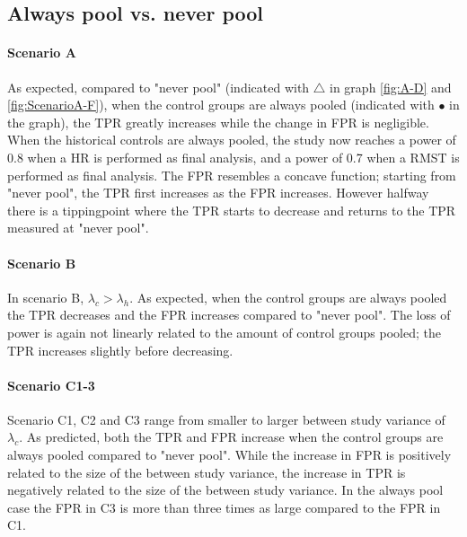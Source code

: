 \documentclass[Royal,sagev,times]{sagej}
\begin{document}
\subsection{Always pool vs. never pool}
\paragraph{Scenario A}
As expected, compared to "never pool" (indicated with $\triangle$ in graph \ref{fig:A-D} and \ref{fig:ScenarioA-F}), when the control groups are always pooled (indicated with $\bullet$ in the graph), the TPR greatly increases while the change in FPR is negligible. When the historical controls are always pooled, the study now reaches a power of 0.8 when a HR is performed as final analysis, and a power of 0.7 when a RMST is performed as final analysis. The FPR resembles a concave function; starting from "never pool", the TPR first increases as the FPR increases. However halfway there is a tippingpoint where the TPR starts to decrease and returns to the TPR measured at "never pool".

\paragraph{Scenario B}
In scenario B, $\lambda_{c} > \lambda_{h}$. As expected, when the control groups are always pooled the TPR decreases and the FPR increases compared to "never pool". The loss of power is again not linearly related to the amount of control groups pooled; the TPR increases slightly before decreasing. 

\paragraph{Scenario C1-3}
Scenario C1, C2 and C3 range from smaller to larger between study variance of $\lambda_{c}$. As predicted, both the TPR and FPR increase when the control groups are always pooled compared to "never pool". While the increase in FPR is positively related to the size of the between study variance, the increase in TPR is negatively related to the size of the between study variance. In the always pool case the FPR in C3 is more than three times as large compared to the FPR in C1.
\end{document}
